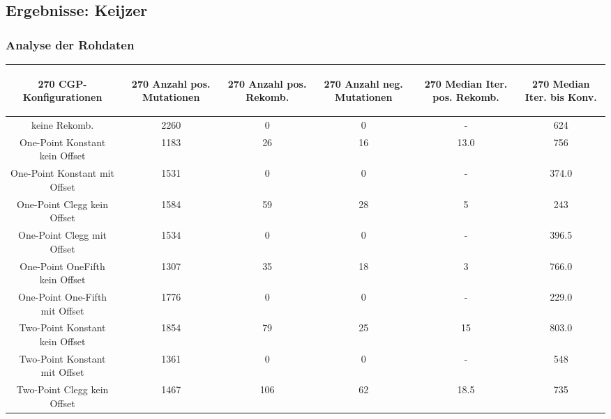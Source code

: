 \subsection{Ergebnisse: Keijzer}
\label{subsec:ergebnisseKeijzer}
\subsubsection{Analyse der Rohdaten}
\label{keijzer:analyseRohdaten}

\begin{table}[H]
	\centering
	\begin{tabular}{c | c | c | c | c | c }
		\begin{turn}{270} \textbf{CGP-Konfigurationen} \end{turn} & \begin{turn}{270} \textbf{Anzahl pos. Mutationen} \end{turn} & \begin{turn}{270} \textbf{Anzahl pos. Rekomb.} \end{turn} & \begin{turn}{270} \textbf{Anzahl neg. Mutationen} \end{turn} & \begin{turn}{270} \textbf{Median Iter. pos. Rekomb.} \end{turn} & \begin{turn}{270} \textbf{Median Iter. bis Konv.} \end{turn}\\
		\hline
		keine Rekomb. & 2260 & 0 & 0 & - & 624\\
		\hline
		One-Point Konstant kein Offset & 1183 & 26 & 16 & 13.0 & 756\\
		\hline
		One-Point Konstant mit Offset & 1531 & 0 & 0 & - & 374.0\\
		\hline
		One-Point Clegg kein Offset & 1584 & 59 & 28 & 5 & 243\\
		\hline
		One-Point Clegg mit Offset & 1534 & 0 & 0 & - & 396.5\\
		\hline
		One-Point OneFifth kein Offset & 1307 & 35 & 18 & 3 & 766.0\\
		\hline
		One-Point One-Fifth mit Offset & 1776 & 0 & 0 & - & 229.0\\
		\hline
		Two-Point Konstant kein Offset & 1854 & 79 & 25 & 15 & 803.0\\
		\hline
		Two-Point Konstant mit Offset & 1361 & 0 & 0 & - & 548\\
		\hline
		Two-Point Clegg kein Offset & 1467 & 106 & 62 & 18.5 & 735\\

\end{tabular}
\end{table}
